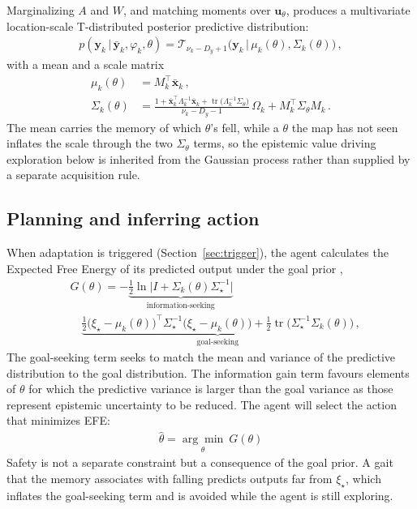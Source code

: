 \documentclass[letterpaper, 10 pt, conference]{ieeeconf}  %
\DeclareMathOperator{\tr}{tr}
\newcommand{\given}[1][]{\,#1\vert\,}
\begin{document}
Marginalizing $A$ and $W$, and matching moments over $\mathbf{u}_{\theta}$, produces a multivariate location-scale T-distributed posterior predictive distribution:
\begin{align} \label{eq:predictive}
	p(\mathbf{y}_k \given \bar{\mathbf{y}}_k, \varphi_k, \theta) = \mathcal{T}_{\nu_k - D_y + 1} \big(\mathbf{y}_k \given \mu_k(\theta), \Sigma_k(\theta)\big) \, ,
\end{align}
with a mean and a scale matrix
\begin{align} \label{eq:predictive-moments}
    \mu_k(\theta) &= M_k^\top \bar{\mathbf{x}}_k \, ,  \\
    \Sigma_k(\theta) &= \frac{1 + \bar{\mathbf{x}}_k^\top \Lambda_k^{-1} \bar{\mathbf{x}}_k + \tr\big(\Lambda_k^{-1}\Sigma_{\theta}\big)}{\nu_k - D_y - 1}\,\Omega_k + M_k^\top \Sigma_{\theta} M_k \, . \nonumber
\end{align}
The mean carries the memory of which $\theta$'s fell, while a $\theta$ the map has not seen inflates the scale through the two $\Sigma_{\theta}$ terms, so the epistemic value driving exploration below is inherited from the Gaussian process rather than supplied by a separate acquisition rule.

\subsection{Planning and inferring action}
When adaptation is triggered (Section~\ref{sec:trigger}), the agent calculates the Expected Free Energy of its predicted output under the goal prior \cite{kouw2023information},
\begin{align} \label{eq:EFE}
    &G(\theta) = - \underbrace{\tfrac{1}{2}\ln\!\big|I + \Sigma_k(\theta) \Sigma_{\star}^{-1}\big|}_{\text{information-seeking}}  \\
	&\quad \underbrace{\tfrac{1}{2}\big(\xi_{\star} \! - \! \mu_k(\theta)\big)^{\!\top} \Sigma_{\star}^{-1} \big(\xi_{\star} \! - \! \mu_k(\theta)\big) \! +\! \tfrac{1}{2}\tr\!\big(\Sigma_{\star}^{-1}\Sigma_k(\theta)\big)}_{\text{goal-seeking}} \,, \nonumber
\end{align}
The goal-seeking term seeks to match the mean and variance of the predictive distribution to the goal distribution. The information gain term favours elements of $\theta$ for which the predictive variance is larger than the goal variance as those represent epistemic uncertainty to be reduced. The agent will select the action that minimizes EFE:
\begin{align}
	\hat{\theta} =  \underset{\theta}{\arg \min}\  G(\theta)
\end{align}
Safety is not a separate constraint but a consequence of the goal prior. A gait that the memory associates with falling predicts outputs far from $\xi_{\star}$, which inflates the goal-seeking term and is avoided while the agent is still exploring.
\end{document}

